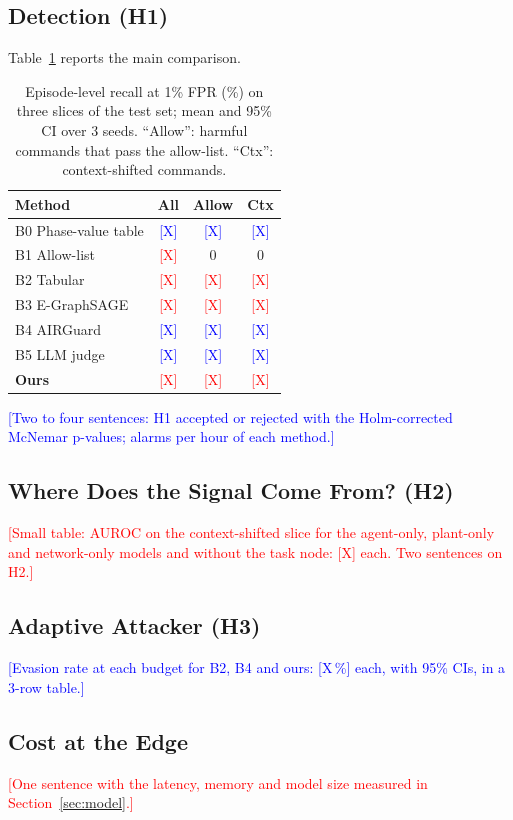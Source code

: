 \documentclass[journal]{IEEEtran}
\newcommand{\billal}[1]{\textcolor{red}{#1}}
\newcommand{\yulliwas}[1]{\textcolor{blue}{#1}}
\begin{document}
\subsection{Detection (H1)}
Table~\ref{tab:main} reports the main comparison.

\begin{table}[!t]
\centering
\caption{Episode-level recall at 1\% FPR (\%) on three slices of the test set; mean and 95\% CI over 3 seeds. ``Allow'': harmful commands that pass the allow-list. ``Ctx'': context-shifted commands.}
\label{tab:main}
\footnotesize\setlength{\tabcolsep}{4pt}
\begin{tabular}{lccc}
\toprule
Method & All & Allow & Ctx \\
\midrule
B0 Phase-value table & \yulliwas{[X]} & \yulliwas{[X]} & \yulliwas{[X]} \\
B1 Allow-list & \billal{[X]} & 0 & 0 \\
B2 Tabular & \billal{[X]} & \billal{[X]} & \billal{[X]} \\
B3 E-GraphSAGE & \billal{[X]} & \billal{[X]} & \billal{[X]} \\
B4 AIRGuard & \yulliwas{[X]} & \yulliwas{[X]} & \yulliwas{[X]} \\
B5 LLM judge & \yulliwas{[X]} & \yulliwas{[X]} & \yulliwas{[X]} \\
\textbf{Ours} & \billal{[X]} & \billal{[X]} & \billal{[X]} \\
\bottomrule
\end{tabular}
\end{table}

\yulliwas{[Two to four sentences: H1 accepted or rejected with the Holm-corrected McNemar p-values; alarms per hour of each method.]}

\subsection{Where Does the Signal Come From? (H2)}
\billal{[Small table: AUROC on the context-shifted slice for the agent-only, plant-only and network-only models and without the task node: [X] each. Two sentences on H2.]}

\subsection{Adaptive Attacker (H3)}
\yulliwas{[Evasion rate at each budget for B2, B4 and ours: [X\,\%] each, with 95\% CIs, in a 3-row table.]}

\subsection{Cost at the Edge}
\billal{[One sentence with the latency, memory and model size measured in Section~\ref{sec:model}.]}
\end{document}
